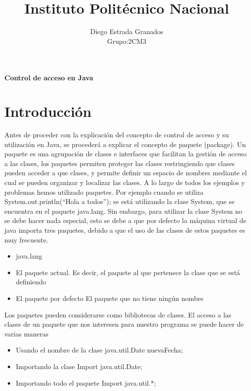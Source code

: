 \documentclass[12pt,letterpaper]{article}
\author{Diego Estrada Granados\\Grupo:2CM3}
\title{Instituto Politécnico Nacional}
\begin{document}
\maketitle
\begin{center}
\paragraph*{\textbf{Control de acceso en Java}}
\end{center}

\section{Introducción}
Antes de proceder con la explicación del concepto de control de acceso y su utilización en Java, se procederá a explicar el concepto de paquete (package).
Un paquete es una agrupación de clases e interfaces que facilitan la gestión de acceso a las clases, los paquetes permiten proteger las clases restringiendo que clases pueden acceder a que clases, y permite definir un espacio de nombres mediante el cual se pueden organizar y localizar las clases.
A lo largo de todos los ejemplos y problemas hemos utilizado paquetes. Por ejemplo cuando se utiliza System.out.println(“Hola a todos”); se está utilizando la clase System, que se encuentra en el paquete java.lang. Sin embargo, para utilizar la clase System no se debe hacer nada especial, esto se debe a que por defecto la máquina virtual de java importa tres paquetes, debido a que el uso de las clases de estos paquetes es muy frecuente.

\begin{itemize}
\item java.lang
\item El paquete actual. Es decir, el paquete al que pertenece la clase que se está definiendo 
\item El paquete por defecto El paquete que no tiene ningún nombre 
\end{itemize}

Los paquetes pueden considerarse como bibliotecas de clases. El acceso a las clases de un paquete que nos interesen para nuestro programa se puede hacer de varias maneras 

\begin{itemize}
\item Usando el nombre de la clase java.util.Date nuevaFecha;
\item Importando la clase Import java.util.Date;
\item Importando todo el paquete Import java.util.*; 
\end{itemize}
\end{document}
